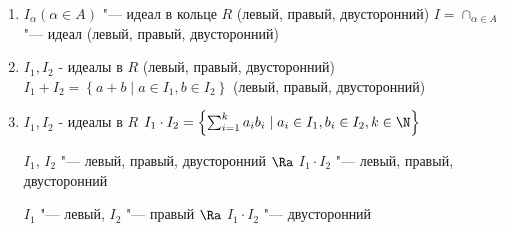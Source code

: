\begin{enumerate}
	\item $I_\alpha (\alpha \in A)$ "--- идеал в кольце $R$ (левый, правый, двусторонний)
	$I = \cap_{\alpha \in A}$ "--- идеал (левый, правый, двусторонний)
	\item $I_1, I_2$ - идеалы в $R$ (левый, правый, двусторонний)
	$I_1 + I_2 = \left\{  a + b \mid a \in I_1, b \in I_2 \right\}$ (левый, правый, двусторонний)
	\item $I_1, I_2$ - идеалы в $R$
	$I_1 \cdot I_2 = \left\{  \sum_{i=1}^k a_i b_i \mid a_i \in I_1, b_i \in I_2, k \in \N \right\}$
	
	$I_1$, $I_2$ "--- левый, правый, двусторонний  $\Ra$ $I_1 \cdot I_2$ "--- левый, правый, двусторонний
	
	$I_1$ "--- левый, $I_2$ "--- правый $\Ra$ $I_1 \cdot I_2$ "--- двусторонний
\end{enumerate}

